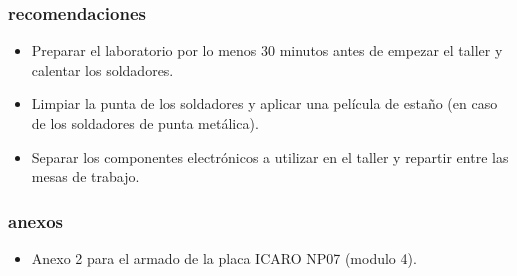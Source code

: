 \subsubsection{recomendaciones}

\begin{itemize}
  \item Preparar el laboratorio por lo menos 30 minutos antes de empezar el taller y calentar los soldadores.

  \item Limpiar la punta de los soldadores y aplicar una película de estaño (en caso de los soldadores de punta metálica).

  \item Separar los componentes electrónicos a utilizar en el taller y repartir entre las mesas de trabajo.

\end{itemize}

\subsubsection{anexos}
\begin{itemize}
  \item Anexo 2 para el armado de la placa ICARO NP07 (modulo 4).
\end{itemize}
\newpage
